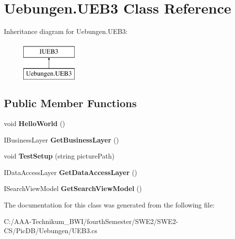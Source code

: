 \hypertarget{class_uebungen_1_1_u_e_b3}{}\section{Uebungen.\+U\+E\+B3 Class Reference}
\label{class_uebungen_1_1_u_e_b3}
Inheritance diagram for Uebungen.\+U\+E\+B3\+:\begin{figure}[H]
\begin{center}
\leavevmode
\includegraphics[height=2.000000cm]{class_uebungen_1_1_u_e_b3}
\end{center}
\end{figure}
\subsection*{Public Member Functions}
\begin{DoxyCompactItemize}
\item 
\mbox{\label{class_uebungen_1_1_u_e_b3_af7f4d32d19e849443942ca0ad9209af8}} 
void {\bfseries Hello\+World} ()
\item 
\mbox{\label{class_uebungen_1_1_u_e_b3_a30cc4587d20237a3f98eba0d14667d85}} 
I\+Business\+Layer {\bfseries Get\+Business\+Layer} ()
\item 
\mbox{\label{class_uebungen_1_1_u_e_b3_acfeb6533720f65de63188217f30b7d7b}} 
void {\bfseries Test\+Setup} (string picture\+Path)
\item 
\mbox{\label{class_uebungen_1_1_u_e_b3_a1aafc3c67558d516ba406482e8030f93}} 
I\+Data\+Access\+Layer {\bfseries Get\+Data\+Access\+Layer} ()
\item 
\mbox{\label{class_uebungen_1_1_u_e_b3_a87746b768d7212e98f33ea9d75642c7e}} 
I\+Search\+View\+Model {\bfseries Get\+Search\+View\+Model} ()
\end{DoxyCompactItemize}


The documentation for this class was generated from the following file\+:\begin{DoxyCompactItemize}
\item 
C\+:/\+A\+A\+A-\/\+Technikum\+\_\+\+B\+W\+I/fourth\+Semester/\+S\+W\+E2/\+S\+W\+E2-\/\+C\+S/\+Pic\+D\+B/\+Uebungen/U\+E\+B3.\+cs\end{DoxyCompactItemize}
